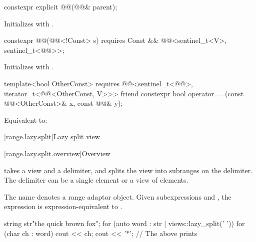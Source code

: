 \begin{itemdecl}
constexpr explicit @@(@@& parent);
\end{itemdecl}

\begin{itemdescr}
\pnum
\effects
Initializes  with .
\end{itemdescr}

\begin{itemdecl}
constexpr @@(@@<!Const> s)
  requires Const && @@<sentinel_t<V>, sentinel_t<@@>>;
\end{itemdecl}

\begin{itemdescr}
\pnum
\effects
Initializes  with .
\end{itemdescr}

\begin{itemdecl}
template<bool OtherConst>
  requires @@<sentinel_t<@@>, iterator_t<@@<OtherConst, V>>>
friend constexpr bool operator==(const @@<OtherConst>& x, const @@& y);
\end{itemdecl}

\begin{itemdescr}
\pnum
\effects
Equivalent to: 
\end{itemdescr}

[range.lazy.split]{Lazy split view}

[range.lazy.split.overview]{Overview}

\pnum
{} takes a view and a delimiter, and splits
the view into subranges on the delimiter. The delimiter can be
a single element or a view of elements.

\pnum
{}%
The name  denotes a
range adaptor object.
Given subexpressions  and ,
the expression  is expression-equivalent to
.

\pnum
\begin{example}
\begin{codeblock}
string str{"the quick brown fox"};
for (auto word : str | views::lazy_split(' ')) {
  for (char ch : word)
    cout << ch;
  cout << '*';
}
// The above prints 
\end{codeblock}
\end{example}

